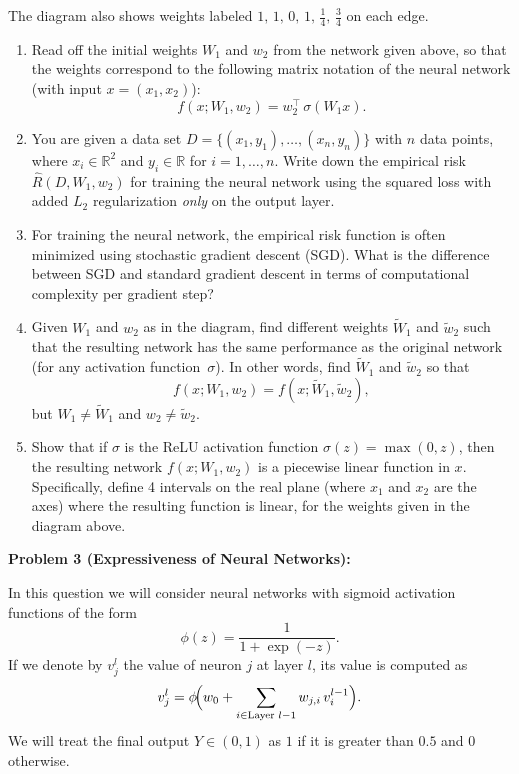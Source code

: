 \documentclass[twocolumn]{article}
\begin{document}
\begin{spacing}{1}
The diagram also shows weights labeled $1,\,1,\,0,\,1,\,\tfrac{1}{4},\,\tfrac{3}{4}$ on each edge.

\begin{enumerate}
\item Read off the initial weights $W_1$ and $w_2$ from the network given above, so that the weights
correspond to the following matrix notation of the neural network (with input $x = (x_1, x_2)$):
\[
f(x;W_1,w_2) = w_2^\top\,\sigma(W_1 x).
\]

\item You are given a data set $D = \{(x_1,y_1),\dots,(x_n,y_n)\}$ with $n$ data points, where $x_i\in\mathbb{R}^2$
and $y_i\in\mathbb{R}$ for $i=1,\dots,n.$ Write down the empirical risk $\hat{R}(D,W_1,w_2)$ for training
the neural network using the squared loss with added $L_2$ regularization \emph{only} on the output layer.

\item For training the neural network, the empirical risk function is often minimized using stochastic
gradient descent (SGD). What is the difference between SGD and standard gradient descent in terms
of computational complexity per gradient step?

\item Given $W_1$ and $w_2$ as in the diagram, find different weights $\widetilde{W}_1$ and $\widetilde{w}_2$
such that the resulting network has the same performance as the original network (for any activation
function~$\sigma$). In other words, find $\widetilde{W}_1$ and $\widetilde{w}_2$ so that 
\[
f(x;W_1,w_2) = f(x;\widetilde{W}_1, \widetilde{w}_2),
\]
but $W_1 \neq \widetilde{W}_1$ and $w_2 \neq \widetilde{w}_2$.

\item Show that if $\sigma$ is the ReLU activation function $\sigma(z)=\max(0,z)$, then the resulting network
$f(x;W_1,w_2)$ is a piecewise linear function in $x$. Specifically, define 4 intervals on the real plane
(where $x_1$ and $x_2$ are the axes) where the resulting function is linear, for the weights given in the
diagram above.
\end{enumerate}

\bigskip
\noindent
\textbf{Problem 3 (Expressiveness of Neural Networks):}

In this question we will consider neural networks with sigmoid activation functions of the form
\[
\phi(z) = \frac{1}{1 + \exp(-z)}.
\]
If we denote by $v_j^l$ the value of neuron $j$ at layer $l$, its value is computed as
\[
v_j^l = \phi\!\Bigl(w_0 + \sum_{i\in\text{Layer }l-1} w_{j,i}\,v_i^{l-1}\Bigr).
\]
We will treat the final output $Y\in(0,1)$ as $1$ if it is greater than $0.5$ and $0$ otherwise.


\end{spacing}
\end{document}
